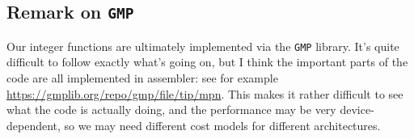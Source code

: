 \documentclass[a4paper]{article}
\begin{document}
\subsection*{Remark on \texttt{GMP}}
Our integer functions are ultimately implemented via the \texttt{GMP} library.
It's quite difficult to follow exactly what's going on, but I think
the important parts of the code are all implemented in assembler: see
for example \url{https://gmplib.org/repo/gmp/file/tip/mpn}.  This
makes it rather difficult to see what the code is actually doing, and
the performance may be very device-dependent, so we may need different
cost models for different architectures.
\end{document}
